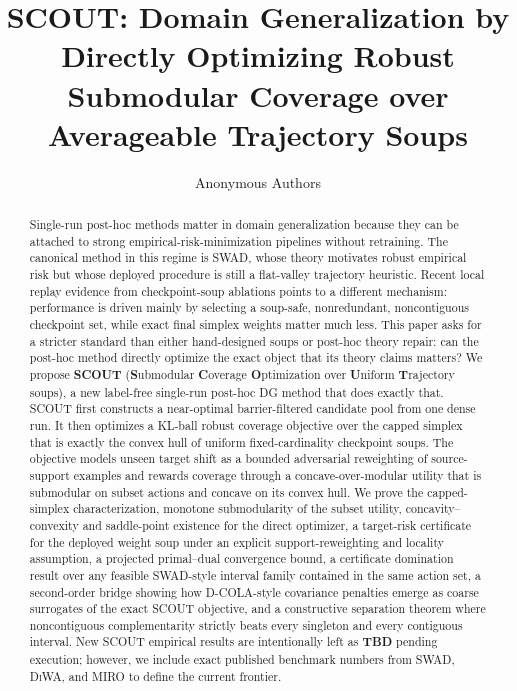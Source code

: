 \documentclass{article}
\title{SCOUT: Domain Generalization by Directly Optimizing Robust Submodular Coverage over Averageable Trajectory Soups}
\author{Anonymous Authors}
\newcommand{\TBD}{\textbf{TBD}}
\newcommand{\scout}{\textup{\textsc{SCOUT}}}
\newcommand{\swad}{\textup{\textsc{SWAD}}}
\newcommand{\dcola}{\textup{\textsc{D-COLA}}}
\newcommand{\diwa}{\textup{\textsc{DiWA}}}
\newcommand{\miro}{\textup{\textsc{MIRO}}}
\begin{document}
\maketitle

\begin{abstract}
Single-run post-hoc methods matter in domain generalization because they can be attached to strong empirical-risk-minimization pipelines without retraining. The canonical method in this regime is \swad{}, whose theory motivates robust empirical risk but whose deployed procedure is still a flat-valley trajectory heuristic. Recent local replay evidence from checkpoint-soup ablations points to a different mechanism: performance is driven mainly by selecting a soup-safe, nonredundant, noncontiguous checkpoint set, while exact final simplex weights matter much less. This paper asks for a stricter standard than either hand-designed soups or post-hoc theory repair: can the post-hoc method directly optimize the exact object that its theory claims matters? We propose \textbf{\scout{}} (\textbf{S}ubmodular \textbf{C}overage \textbf{O}ptimization over \textbf{U}niform \textbf{T}rajectory soups), a new label-free single-run post-hoc DG method that does exactly that. \scout{} first constructs a near-optimal barrier-filtered candidate pool from one dense run. It then optimizes a KL-ball robust coverage objective over the capped simplex that is exactly the convex hull of uniform fixed-cardinality checkpoint soups. The objective models unseen target shift as a bounded adversarial reweighting of source-support examples and rewards coverage through a concave-over-modular utility that is submodular on subset actions and concave on its convex hull. We prove the capped-simplex characterization, monotone submodularity of the subset utility, concavity--convexity and saddle-point existence for the direct optimizer, a target-risk certificate for the deployed weight soup under an explicit support-reweighting and locality assumption, a projected primal--dual convergence bound, a certificate domination result over any feasible \swad{}-style interval family contained in the same action set, a second-order bridge showing how \dcola{}-style covariance penalties emerge as coarse surrogates of the exact \scout{} objective, and a constructive separation theorem where noncontiguous complementarity strictly beats every singleton and every contiguous interval. New \scout{} empirical results are intentionally left as \TBD{} pending execution; however, we include exact published benchmark numbers from \swad{}, \diwa{}, and \miro{} to define the current frontier.
\end{abstract}
\end{document}
